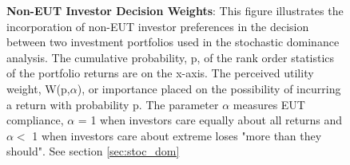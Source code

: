 \clearpage
%		
%		
\begin{figure}[htb]
	\centering
	\caption{{\bf These figures show the smoothed kernel density PDF estimates and empirical CDFs calculated for the returns to the unconstrained AV and SV managed US equity portfolios. The CDF functions are shown to illuminate the stochastic dominance tests which follow. See section \ref{sec:stoc_dom}}} \label{fig:kd_graph}
	\begin{subfigure}{\textwidth}
		
	\end{subfigure}
	
	\begin{subfigure}{\textwidth}
		
	\end{subfigure}
	
	\begin{subfigure}{\textwidth}
		
	\end{subfigure}
	
	\begin{subfigure}{\textwidth}
		
	\end{subfigure}
\end{figure}
\clearpage
\begin{figure}[htb]
	\centering
	\caption{{\bf Non-EUT Investor Decision Weights}: This figure illustrates the incorporation of non-EUT investor preferences in the decision between two investment portfolios used in the stochastic dominance analysis. The cumulative probability, p, of the rank order statistics of the portfolio returns are on the x-axis. The perceived utility weight, W(p,$\alpha$), or importance placed on the possibility of incurring a return with probability p. The parameter $\alpha$ measures EUT compliance, $\alpha$ = 1 when investors care equally about all returns and $\alpha <$ 1 when investors care about extreme loses "more than they should". See section \ref{sec:stoc_dom}} \label{fig:sd_ill_graph}
	
\end{figure}
\clearpage